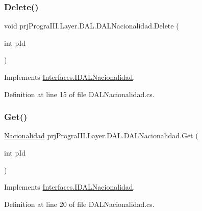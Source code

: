 \subsubsection{\texorpdfstring{Delete()}{Delete()}}
{\footnotesize\ttfamily void prj\+Progra\+I\+I\+I.\+Layer.\+D\+A\+L.\+D\+A\+L\+Nacionalidad.\+Delete (\begin{DoxyParamCaption}\item[{int}]{p\+Id }\end{DoxyParamCaption})}



Implements \hyperlink{interface_interfaces_1_1_i_d_a_l_nacionalidad_ab50e49973f4bce541e8a39d9f5b344bd}{Interfaces.\+I\+D\+A\+L\+Nacionalidad}.



Definition at line 15 of file D\+A\+L\+Nacionalidad.\+cs.

\hypertarget{classprj_progra_i_i_i_1_1_layer_1_1_d_a_l_1_1_d_a_l_nacionalidad_aaae73fec1bc1e05c37358116139ce47a}{}\label{classprj_progra_i_i_i_1_1_layer_1_1_d_a_l_1_1_d_a_l_nacionalidad_aaae73fec1bc1e05c37358116139ce47a} 
\subsubsection{\texorpdfstring{Get()}{Get()}}
{\footnotesize\ttfamily \hyperlink{classprj_progra_i_i_i_1_1_layer_1_1_entities_1_1_nacionalidad}{Nacionalidad} prj\+Progra\+I\+I\+I.\+Layer.\+D\+A\+L.\+D\+A\+L\+Nacionalidad.\+Get (\begin{DoxyParamCaption}\item[{int}]{p\+Id }\end{DoxyParamCaption})}



Implements \hyperlink{interface_interfaces_1_1_i_d_a_l_nacionalidad_a1a283052260a80ed1d3a94d2e1dc520e}{Interfaces.\+I\+D\+A\+L\+Nacionalidad}.



Definition at line 20 of file D\+A\+L\+Nacionalidad.\+cs.

